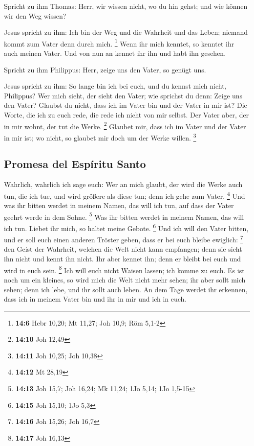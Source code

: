  Spricht zu ihm Thomas: Herr, wir wissen nicht, wo du hin
gehst; und wie können wir den Weg wissen?

 Jesus spricht zu ihm: Ich bin der Weg und die Wahrheit
und das Leben; niemand kommt zum Vater denn durch mich. \footnote{\textbf{14:6}
  Hebr 10,20; Mt 11,27; Joh 10,9; Röm 5,1-2}  Wenn ihr
mich kenntet, so kenntet ihr auch meinen Vater. Und von nun an kennet
ihr ihn und habt ihn gesehen.

 Spricht zu ihm Philippus: Herr, zeige uns den Vater, so
genügt uns.

 Jesus spricht zu ihm: So lange bin ich bei euch, und du
kennst mich nicht, Philippus? Wer mich sieht, der sieht den Vater; wie
sprichst du denn: Zeige uns den Vater?  Glaubst du nicht,
dass ich im Vater bin und der Vater in mir ist? Die Worte, die ich zu
euch rede, die rede ich nicht von mir selbst. Der Vater aber, der in mir
wohnt, der tut die Werke. \footnote{\textbf{14:10} Joh 12,49}
 Glaubet mir, dass ich im Vater und der Vater in mir ist;
wo nicht, so glaubet mir doch um der Werke willen. \footnote{\textbf{14:11}
  Joh 10,25; Joh 10,38}

\hypertarget{promesa-del-espuxedritu-santo}{%
\subsection{Promesa del Espíritu
Santo}\label{promesa-del-espuxedritu-santo}}

 Wahrlich, wahrlich ich sage euch: Wer an mich glaubt,
der wird die Werke auch tun, die ich tue, und wird größere als diese
tun; denn ich gehe zum Vater. \footnote{\textbf{14:12} Mt 28,19}
 Und was ihr bitten werdet in meinem Namen, das will ich
tun, auf dass der Vater geehrt werde in dem Sohne. \footnote{\textbf{14:13}
  Joh 15,7; Joh 16,24; Mk 11,24; 1Jo 5,14; 1Jo 1,5-15} 
Was ihr bitten werdet in meinem Namen, das will ich tun. 
Liebet ihr mich, so haltet meine Gebote. \footnote{\textbf{14:15} Joh
  15,10; 1Jo 5,3}  Und ich will den Vater bitten, und er
soll euch einen anderen Tröster geben, dass er bei euch bleibe ewiglich:
\footnote{\textbf{14:16} Joh 15,26; Joh 16,7}  den Geist
der Wahrheit, welchen die Welt nicht kann empfangen; denn sie sieht ihn
nicht und kennt ihn nicht. Ihr aber kennet ihn; denn er bleibt bei euch
und wird in euch sein. \footnote{\textbf{14:17} Joh 16,13}
 Ich will euch nicht Waisen lassen; ich komme zu euch.
 Es ist noch um ein kleines, so wird mich die Welt nicht
mehr sehen; ihr aber sollt mich sehen; denn ich lebe, und ihr sollt auch
leben.  An dem Tage werdet ihr erkennen, dass ich in
meinem Vater bin und ihr in mir und ich in euch.

